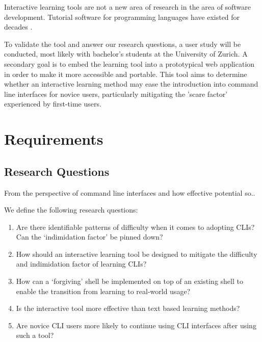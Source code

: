 Interactive learning tools are not a new area of research in the area of
software development. Tutorial software for programming languages have existed
for decades \cite{anderson1985lisp, anderson1986automatedtutoring,
gerdes2012interactive, permpool2019interactive, lee2005intelligent,
jeuring2011programming,   holland2009j}.

To validate the tool and answer our research questions, a user study will be
conducted, most likely with bachelor's students at the University of Zurich. A
secondary goal is to embed the learning tool into a prototypical web
application in order to make it more accessible and portable. This tool aims to
determine whether an interactive learning method may ease the introduction into
command line interfaces for novice users, particularly mitigating the 'scare
factor' experienced by first-time users.

\section{Requirements}


\subsection{Research Questions}
\label{subsec:rqs}

From the perspective of command line interfaces and how effective potential so..

We define the following research questions:

\begin{enumerate}[label=\textbf{RQ \arabic*}]
	\item Are there identifiable patterns of difficulty when it
	      comes to adopting CLIs? Can the `indimidation factor' be pinned down? \label{rq:1}
	\item How should an interactive learning tool be designed to mitigate
	      the difficulty and indimidation factor of learning CLIs? \label{rq:2}
	\item How can a `forgiving' shell be implemented on top of an existing
	      shell to enable the transition from learning to real-world usage? \label{rq:3}
	\item Is the interactive tool more effective than text based learning methods? \label{rq:4}
	\item Are novice CLI users more likely to continue
	      using CLI interfaces after using such a tool? \label{rq:5}
\end{enumerate}

